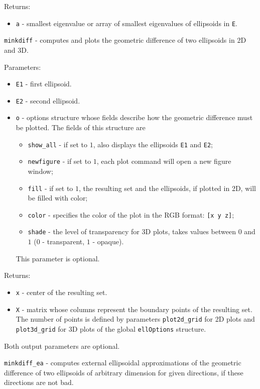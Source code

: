 \documentclass{report}
\begin{document}
Returns:
\begin{itemize}
\item {\tt a} - smallest eigenvalue or array of smallest eigenvalues of
ellipsoids in {\tt E}.
\end{itemize}

\newpage

{\Large {\tt minkdiff}} - computes and plots the geometric difference of
two ellipsoids in 2D and 3D.

Parameters:
\begin{itemize}
\item {\tt E1} - first ellipsoid.
\item {\tt E2} - second ellipsoid.
\item {\tt o} - options structure whose fields describe how the geometric
difference must be plotted. The fields of this structure are
\begin{itemize}
\item {\tt show\_all} - if set to $1$, also displays the ellipsoids
{\tt E1} and {\tt E2};
\item {\tt newfigure} - if set to $1$, each plot command will open a new
figure window;
\item {\tt fill} - if set to $1$, the resulting set and the ellipsoids,
if plotted in 2D, will be filled with color;
\item {\tt color} - specifies the color of the plot in the RGB format:
{\tt [x y z]};
\item {\tt shade} - the level of transparency for 3D plots, takes values
between $0$ and $1$ ($0$ - transparent, $1$ - opaque).
\end{itemize}
This parameter is optional.
\end{itemize}

Returns:
\begin{itemize}
\item {\tt x} - center of the resulting set.
\item {\tt X} - matrix whose columns represent the boundary points of the
resulting set. The number of points is defined by parameters
{\tt plot2d\_grid} for 2D plots and {\tt plot3d\_grid} for 3D plots of the
global {\tt ellOptions} structure.
\end{itemize}
Both output parameters are optional.

\newpage

{\Large {\tt minkdiff\_ea}} - computes external ellipsoidal approximations
of the geometric difference of two ellipsoids of arbitrary dimension
for given directions, if these directions are not bad.
\end{document}
